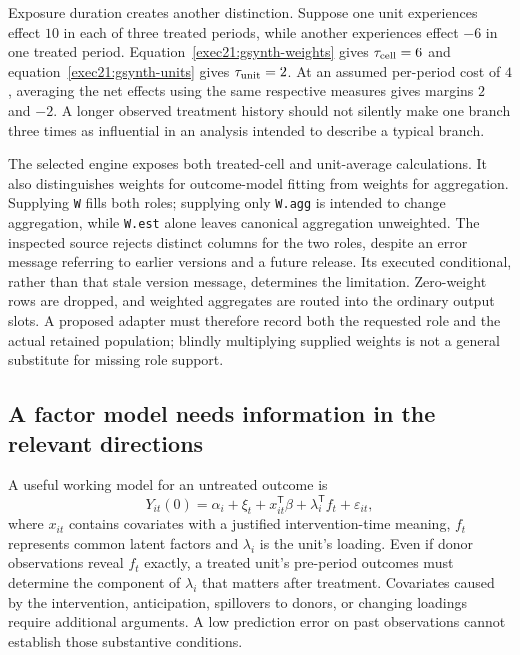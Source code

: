 Exposure duration creates another distinction. Suppose one unit experiences
effect $10$ in each of three treated periods, while another experiences
effect $-6$ in one treated period. Equation~\eqref{exec21:gsynth-weights}
gives $\tau_{\rm cell}=6$ and equation~\eqref{exec21:gsynth-units} gives
$\tau_{\rm unit}=2$. At an assumed per-period cost of $4$, averaging the
net effects using the same respective measures gives margins $2$ and $-2$.
A longer observed treatment history should not silently make one branch
three times as influential in an analysis intended to describe a typical
branch. \citep{exec21_gsynth_reference}

The selected engine exposes both treated-cell and unit-average calculations.
It also distinguishes weights for outcome-model fitting from weights for
aggregation. Supplying \texttt{W} fills both roles; supplying only
\texttt{W.agg} is intended to change aggregation, while \texttt{W.est}
alone leaves canonical aggregation unweighted. The inspected source rejects
distinct columns for the two roles, despite an error message referring to
earlier versions and a future release. Its executed conditional, rather than
that stale version message, determines the limitation. Zero-weight rows are
dropped, and weighted aggregates are routed into the ordinary output slots.
A proposed adapter must therefore record both the requested role and the
actual retained population; blindly multiplying supplied weights is not a
general substitute for missing role support. \citep{exec21_gsynth_engine}

\subsection{A factor model needs information in the relevant directions}
\label{exec21:gsynth-rank}

A useful working model for an untreated outcome is
\begin{equation}
\label{exec21:gsynth-factor}
 Y_{it}(0)=\alpha_i+\xi_t+x_{it}^{\mathsf T}\beta
                     +\lambda_i^{\mathsf T}f_t+\varepsilon_{it},
\end{equation}
where $x_{it}$ contains covariates with a justified intervention-time meaning,
$f_t$ represents common latent factors and $\lambda_i$ is the unit's loading.
Even if donor observations reveal $f_t$ exactly, a treated unit's pre-period
outcomes must determine the component of $\lambda_i$ that matters after
treatment. Covariates caused by the intervention, anticipation, spillovers
to donors, or changing loadings require additional arguments. A low prediction
error on past observations cannot establish those substantive conditions.

